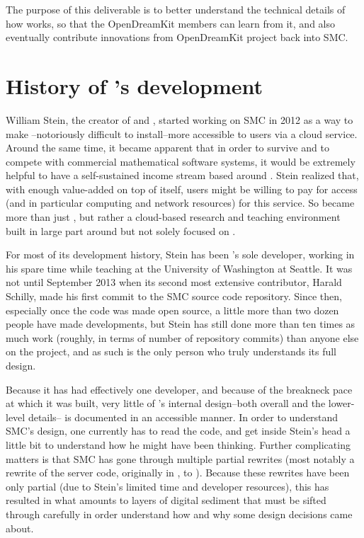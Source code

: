 \documentclass{deliverablereport}
\begin{document}
The purpose of this deliverable is to better understand the technical details
of how \SMC works, so that the OpenDreamKit members can learn from it, and also
eventually contribute innovations from OpenDreamKit project back into SMC.

\section{History of \SMC's development}

William Stein, the creator of \Sage and \SMC, started working on SMC in 2012
as a way to make \Sage--notoriously difficult to install--more accessible to
users via a cloud service.  Around the same time, it became apparent that in
order to survive and to compete with commercial mathematical software systems,
it would be extremely helpful to have a self-sustained income stream based
around \Sage.  Stein realized that, with enough value-added on top of \Sage
itself, users might be willing to pay for access (and in particular computing
and network resources) for this service.  So \SMC became more than just \Sage,
but  rather a cloud-based research and teaching environment built in large part
around but not solely focused on \Sage.

For most of its development history, Stein has been \SMC's sole developer,
working in his spare time while teaching at the University of Washington at
Seattle.  It was not until September 2013 when its second most extensive
contributor, Harald Schilly, made his first commit to the SMC source code
repository.  Since then, especially once the code was made open source, a
little more than two dozen people have made developments, but Stein has
still done more than ten times as much work (roughly, in terms of number of
repository commits) than anyone else on the project, and as such is the only
person who truly understands its full design.

Because it has had effectively one developer, and because of the breakneck pace
at which it was built, very little of \SMC's internal design--both overall and
the lower-level details-- is documented in an accessible manner.  In order to
understand SMC's design, one currently has to read the code, and get inside
Stein's head a little bit to understand how he might have been thinking.
Further complicating matters is that SMC has gone through multiple partial
rewrites (most notably a rewrite of the server code, originally in \Python, to
\JavaScript).  Because these rewrites have been only partial (due to Stein's
limited time and developer resources), this has resulted in what amounts to
layers of digital sediment that must be sifted through carefully in order
understand how and why some design decisions came about.
\end{document}
